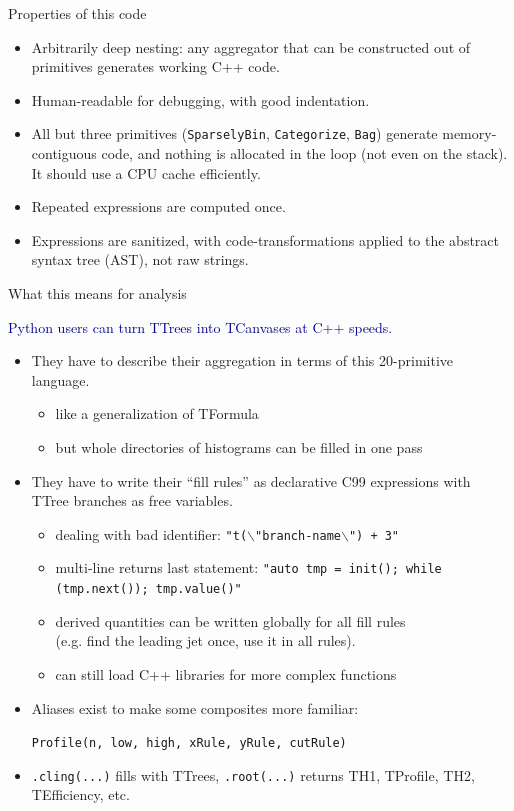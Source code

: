\documentclass{beamer}
\begin{document}
\begin{frame}{Properties of this code}

\begin{itemize}\setlength{\itemsep}{0.35 cm}
\item Arbitrarily deep nesting: any aggregator that can be constructed out of primitives generates working C++ code.
\item Human-readable for debugging, with good indentation.
\item All but three primitives ({\tt\small SparselyBin}, {\tt\small Categorize}, {\tt\small Bag}) generate memory-contiguous code, and nothing is allocated in the loop (not even on the stack). It should use a CPU cache efficiently.
\item Repeated expressions are computed once.
\item Expressions are sanitized, with code-transformations applied to the abstract syntax tree (AST), not raw strings.
\end{itemize}
\end{frame}

\begin{frame}{What this means for analysis}

\vspace{0.5 cm}
\textcolor{darkblue}{Python users can turn TTrees into TCanvases at C++ speeds.}

\begin{itemize}
\item They have to describe their aggregation in terms of this 20-primitive language.
\begin{itemize}
\item like a generalization of TFormula
\item but whole directories of histograms can be filled in one pass
\end{itemize}
\item They have to write their ``fill rules'' as declarative C99 expressions with TTree branches as free variables.
\begin{itemize}
\item dealing with bad identifier: {\tt\small "t($\backslash$"branch-name$\backslash$") + 3"}
\item multi-line returns last statement: {\tt\small "auto tmp = init(); while (tmp.next()); tmp.value()"}
\item derived quantities can be written globally for all fill rules \\ (e.g. find the leading jet once, use it in all rules).
\item can still load C++ libraries for more complex functions
\end{itemize}
\item Aliases exist to make some composites more familiar:

{\tt\small Profile(n, low, high, xRule, yRule, cutRule)}

\item {\tt\small .cling(...)} fills with TTrees, {\tt\small .root(...)} returns TH1, TProfile, TH2, TEfficiency, etc.
\end{itemize}
\end{frame}
\end{document}
